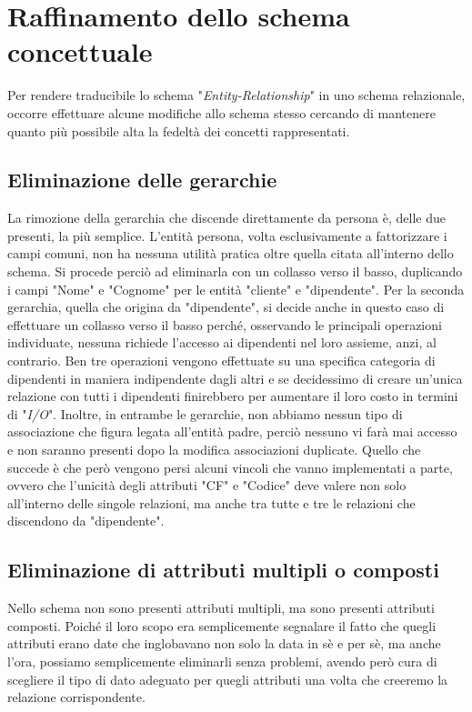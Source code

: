 \documentclass[a4paper, 12pt]{report}
\begin{document}
\newpage

\section{Raffinamento dello schema concettuale}

Per rendere traducibile lo schema "\textit{Entity-Relationship}" in uno schema relazionale, occorre effettuare alcune modifiche allo schema stesso
cercando di mantenere quanto più possibile alta la fedeltà dei concetti rappresentati.

\subsection{Eliminazione delle gerarchie}

La rimozione della gerarchia che discende direttamente da persona è, delle due presenti, la più semplice. L'entità persona, volta esclusivamente a fattorizzare
i campi comuni, non ha nessuna utilità pratica oltre quella citata all'interno dello schema. Si procede perciò ad eliminarla con un collasso verso il basso,
duplicando i campi "Nome" e "Cognome" per le entità "cliente" e "dipendente". Per la seconda gerarchia, quella che origina da "dipendente", si decide anche in questo
caso di effettuare un collasso verso il basso perché, osservando le principali operazioni individuate, nessuna richiede l'accesso ai dipendenti nel loro assieme,
anzi, al contrario. Ben tre operazioni vengono effettuate su una specifica categoria di dipendenti in maniera indipendente dagli altri e se decidessimo di creare un'unica
relazione con tutti i dipendenti finirebbero per aumentare il loro costo in termini di "\textit{I/O}". Inoltre, in entrambe le gerarchie, non abbiamo nessun tipo di associazione
che figura legata all'entità padre, perciò nessuno vi farà mai accesso e non saranno presenti dopo la modifica associazioni duplicate. Quello che succede è che però
vengono persi alcuni vincoli che vanno implementati a parte, ovvero che l'unicità degli attributi "CF" e "Codice" deve valere non solo all'interno delle singole
relazioni, ma anche tra tutte e tre le relazioni che discendono da "dipendente".

\subsection{Eliminazione di attributi multipli o composti}

Nello schema non sono presenti attributi multipli, ma sono presenti attributi composti. Poiché il loro scopo era semplicemente segnalare il fatto che quegli attributi erano date
che inglobavano non solo la data in sè e per sè, ma anche l'ora, possiamo semplicemente eliminarli senza problemi, avendo però cura di scegliere il tipo di dato adeguato
per quegli attributi una volta che creeremo la relazione corrispondente.
\end{document}
